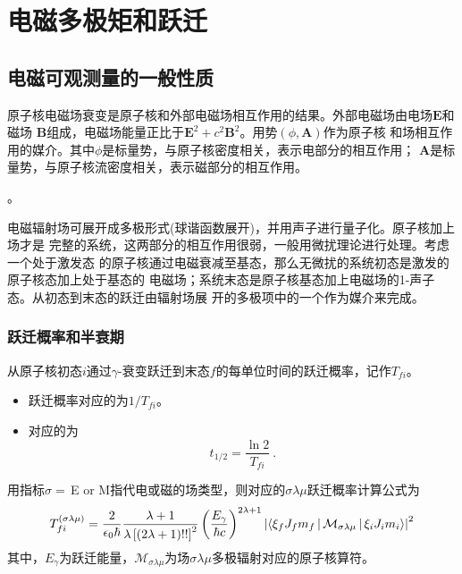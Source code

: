 \chapter{电磁多极矩和跃迁}

\section{电磁可观测量的一般性质}
原子核电磁场衰变是原子核和外部电磁场相互作用的结果。外部电磁场由电场$\bm{E}$和磁场
$\bm{B}$组成，电磁场能量正比于$\bm{E}^2 + c^2 \bm{B}^2$。用势$(\phi, \bm{A})$作为原子核
和场相互作用的媒介。其中$\phi$是标量势，与原子核密度相关，表示电部分的相互作用；
$\bm{A}$是标量势，与原子核流密度相关，表示磁部分的相互作用。

。

电磁辐射场可展开成多极形式(球谐函数展开)，并用声子进行量子化。原子核加上场才是
完整的系统，这两部分的相互作用很弱，一般用微扰理论进行处理。考虑一个处于激发态
的原子核通过电磁衰减至基态，那么无微扰的系统初态是激发的原子核态加上处于基态的
电磁场；系统末态是原子核基态加上电磁场的1-声子态。从初态到末态的跃迁由辐射场展
开的多极项中的一个作为媒介来完成。 

\subsection{跃迁概率和半衰期}
\begin{definition}[跃迁概率]
    从原子核初态$i$通过$\gamma$-衰变跃迁到末态$f$的每单位时间的跃迁概率，记作$T_{fi}$。
\end{definition}
\begin{itemize}
    \item 跃迁概率对应的为$1/T_{fi}$。
    \item 对应的为
    \begin{equation}
        \boxed{
        t_{1/2} = \frac{\ln{2}}{T_{fi}}\ .
        }
    \end{equation}
\end{itemize}

用指标$\sigma=\,$E or M指代电或磁的场类型，则对应的$\sigma\lambda\mu$跃迁概率计算公式为
\begin{equation}
    T_{fi}^{(\sigma\lambda\mu)} = \frac{2}{\epsilon_0\hbar}\frac{\lambda+1}{\lambda\left[(2\lambda+1)!!\right]^2}\left(\frac{E_{\gamma}}{\hbar c}\right)^{2\lambda+1} \left|\Braket{\xi_{f}J_{f}m_{f} | \mathcal{M}_{\sigma\lambda\mu} | \xi_{i} J_{i} m_{i}}\right|^2
\end{equation}
其中，$E_{\gamma}$为跃迁能量，$\mathcal{M}_{\sigma\lambda\mu}$为场$\sigma\lambda\mu$多极辐射对应的原子核算符。


